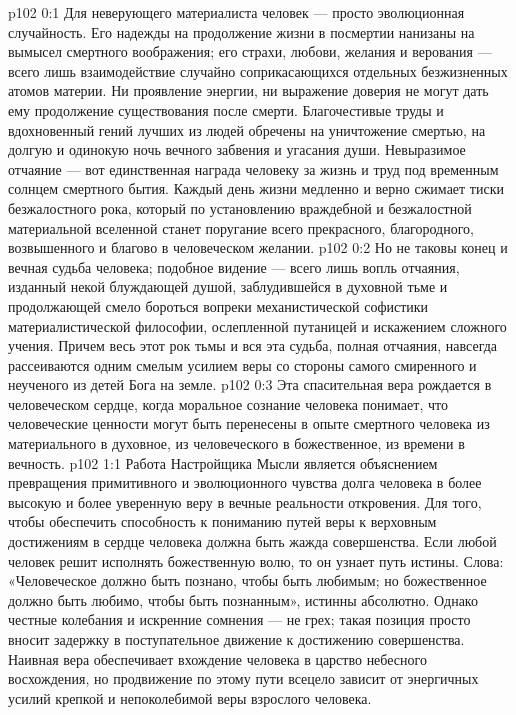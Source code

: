 \author{Мелхиседек}
\vs p102 0:1 Для неверующего материалиста человек --- просто эволюционная случайность. Его надежды на продолжение жизни в посмертии нанизаны на вымысел смертного воображения; его страхи, любови, желания и верования --- всего лишь взаимодействие случайно соприкасающихся отдельных безжизненных атомов материи. Ни проявление энергии, ни выражение доверия не могут дать ему продолжение существования после смерти. Благочестивые труды и вдохновенный гений лучших из людей обречены на уничтожение смертью, на долгую и одинокую ночь вечного забвения и угасания души. Невыразимое отчаяние --- вот единственная награда человеку за жизнь и труд под временным солнцем смертного бытия. Каждый день жизни медленно и верно сжимает тиски безжалостного рока, который по установлению враждебной и безжалостной материальной вселенной станет поругание всего прекрасного, благородного, возвышенного и благово в человеческом желании.
\vs p102 0:2 Но не таковы конец и вечная судьба человека; подобное видение --- всего лишь вопль отчаяния, изданный некой блуждающей душой, заблудившейся в духовной тьме и продолжающей смело бороться вопреки механистической софистики материалистической философии, ослепленной путаницей и искажением сложного учения. Причем весь этот рок тьмы и вся эта судьба, полная отчаяния, навсегда рассеиваются одним смелым усилием веры со стороны самого смиренного и неученого из детей Бога на земле.
\vs p102 0:3 Эта спасительная вера рождается в человеческом сердце, когда моральное сознание человека понимает, что человеческие ценности могут быть перенесены в опыте смертного человека из материального в духовное, из человеческого в божественное, из времени в вечность.
\vs p102 1:1 Работа Настройщика Мысли является объяснением превращения примитивного и эволюционного чувства долга человека в более высокую и более уверенную веру в вечные реальности откровения. Для того, чтобы обеспечить способность к пониманию путей веры к верховным достижениям в сердце человека должна быть жажда совершенства. Если любой человек решит исполнять божественную волю, то он узнает путь истины. Слова: «Человеческое должно быть познано, чтобы быть любимым; но божественное должно быть любимо, чтобы быть познанным», истинны абсолютно. Однако честные колебания и искренние сомнения --- не грех; такая позиция просто вносит задержку в поступательное движение к достижению совершенства. Наивная вера обеспечивает вхождение человека в царство небесного восхождения, но продвижение по этому пути всецело зависит от энергичных усилий крепкой и непоколебимой веры взрослого человека.
